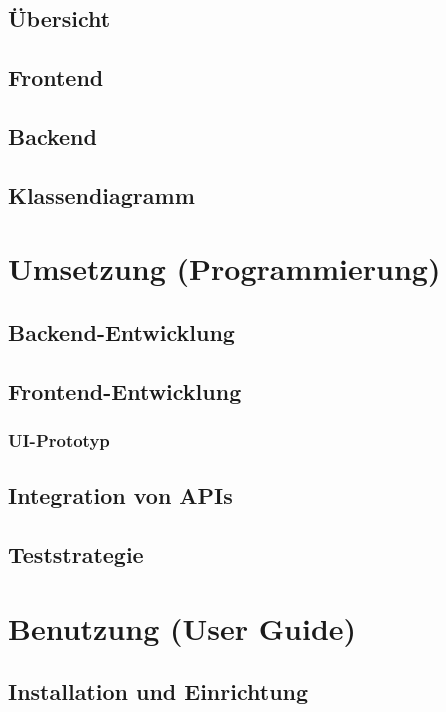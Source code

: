 \documentclass[a4paper]{article}
\begin{document}
\subsection{Übersicht}

\subsection{Frontend}

\subsection{Backend}

\subsection{Klassendiagramm}

\section{Umsetzung (Programmierung)}

\subsection{Backend-Entwicklung}

\subsection{Frontend-Entwicklung}

\subsubsection{UI-Prototyp}

\subsection{Integration von APIs}

\subsection{Teststrategie}

\section{Benutzung (User Guide)}

\subsection{Installation und Einrichtung}
\end{document}

